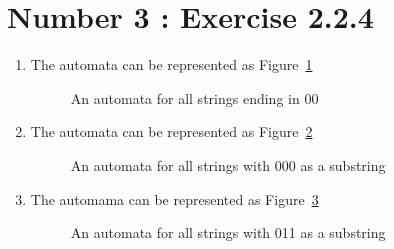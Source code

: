\documentclass[12pt,a4paper,twoside]{article}  %
\begin{document}
\section{Number 3 : Exercise 2.2.4}
\begin{enumerate}

\item The automata can be represented as Figure~\ref{2.2.4.a}
\begin{figure}

\caption{An automata for all strings ending in 00}\label{2.2.4.a}
\end{figure}

\item The automata can be represented as Figure~\ref{2.2.4.b}
\begin{figure}

\caption{An automata for all strings with 000 as a substring}\label{2.2.4.b}
\end{figure}

\item The automama can be represented as  Figure~\ref{2.2.4.c}
\begin{figure}

\caption{An automata for all strings with 011 as a substring}\label{2.2.4.c}
\end{figure}
\end{enumerate}
\end{document}
